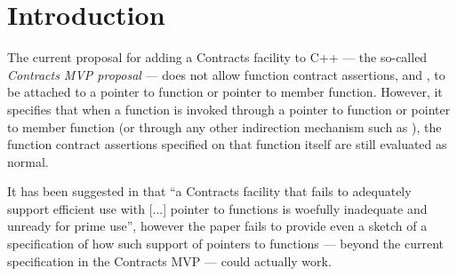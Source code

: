 





\section{Introduction}
\label{sec:intro}

The current proposal \cite{P2900R7} for adding a Contracts facility to C++ --- the so-called \emph{Contracts MVP proposal} --- does not allow function contract assertions,  and , to be attached to a pointer to function or pointer to member function. However, it specifies that when a function is invoked through a pointer to function or pointer to member function (or through any other indirection mechanism such as ), the function contract assertions specified on that function itself are still evaluated as normal.

It has been suggested in \cite{P3173R0} that ``a Contracts facility that fails to adequately support efficient use with [...] pointer to functions is woefully inadequate and unready for prime use'', however the paper fails to provide even a sketch of a specification of how such support of pointers to functions --- beyond the current specification in the Contracts MVP --- could actually work.

